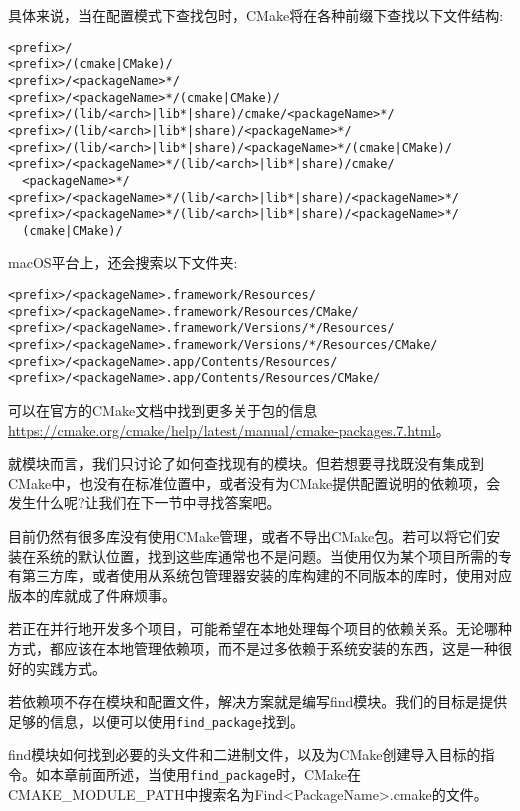 具体来说，当在配置模式下查找包时，CMake将在各种前缀下查找以下文件结构:

\begin{lstlisting}[style=styleCMake]
<prefix>/
<prefix>/(cmake|CMake)/
<prefix>/<packageName>*/
<prefix>/<packageName>*/(cmake|CMake)/
<prefix>/(lib/<arch>|lib*|share)/cmake/<packageName>*/
<prefix>/(lib/<arch>|lib*|share)/<packageName>*/
<prefix>/(lib/<arch>|lib*|share)/<packageName>*/(cmake|CMake)/
<prefix>/<packageName>*/(lib/<arch>|lib*|share)/cmake/
  <packageName>*/
<prefix>/<packageName>*/(lib/<arch>|lib*|share)/<packageName>*/
<prefix>/<packageName>*/(lib/<arch>|lib*|share)/<packageName>*/
  (cmake|CMake)/
\end{lstlisting}

macOS平台上，还会搜索以下文件夹:

\begin{lstlisting}[style=styleCMake]
<prefix>/<packageName>.framework/Resources/
<prefix>/<packageName>.framework/Resources/CMake/
<prefix>/<packageName>.framework/Versions/*/Resources/
<prefix>/<packageName>.framework/Versions/*/Resources/CMake/
<prefix>/<packageName>.app/Contents/Resources/
<prefix>/<packageName>.app/Contents/Resources/CMake/
\end{lstlisting}

可以在官方的CMake文档中找到更多关于包的信息\url{https://cmake.org/cmake/help/latest/manual/cmake-packages.7.html}。

就模块而言，我们只讨论了如何查找现有的模块。但若想要寻找既没有集成到CMake中，也没有在标准位置中，或者没有为CMake提供配置说明的依赖项，会发生什么呢?让我们在下一节中寻找答案吧。


目前仍然有很多库没有使用CMake管理，或者不导出CMake包。若可以将它们安装在系统的默认位置，找到这些库通常也不是问题。当使用仅为某个项目所需的专有第三方库，或者使用从系统包管理器安装的库构建的不同版本的库时，使用对应版本的库就成了件麻烦事。

若正在并行地开发多个项目，可能希望在本地处理每个项目的依赖关系。无论哪种方式，都应该在本地管理依赖项，而不是过多依赖于系统安装的东西，这是一种很好的实践方式。

若依赖项不存在模块和配置文件，解决方案就是编写find模块。我们的目标是提供足够的信息，以便可以使用\texttt{find\_package}找到。

find模块如何找到必要的头文件和二进制文件，以及为CMake创建导入目标的指令。如本章前面所述，当使用\texttt{find\_package}时，CMake在CMAKE\_MODULE\_PATH中搜索名为Find<PackageName>.cmake的文件。

